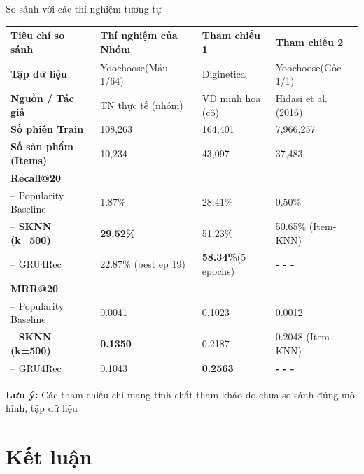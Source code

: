 \documentclass[aspectratio=169, 11pt]{beamer}
\begin{document}
\begin{frame}{So sánh với các thí nghiệm tương tự}
    \vspace{0.5cm}
    \centering
    \scriptsize %
    \begin{tabular}{lp{2.8cm}p{2.3cm}p{3.3cm}}
        \toprule
        \textbf{Tiêu chí so sánh} & \textbf{Thí nghiệm của Nhóm} & \textbf{Tham chiếu 1} & \textbf{Tham chiếu 2} \\
        \midrule
        \textbf{Tập dữ liệu} & Yoochoose(Mẫu 1/64) & Diginetica & Yoochoose(Gốc 1/1) \\
        \textbf{Nguồn / Tác giả} & TN thực tế (nhóm) & VD minh họa (cô) & Hidasi et al. (2016) \\
        \textbf{Số phiên Train} & 108,263 & 164,401 & 7,966,257 \\
        \textbf{Số sản phẩm (Items)} & 10,234 & 43,097 & 37,483 \\
        \midrule
        \textbf{Recall@20} & & & \\
        -- Popularity Baseline & 1.87\% & 28.41\% & 0.50\% \\
        -- \textbf{SKNN (k=500)} & \textbf{29.52\%} & 51.23\% & 50.65\% (Item-KNN) \\
        -- GRU4Rec & 22.87\% (best ep 19) & \textbf{58.34\%}(5 epochs) & \textbf{- - -} \\
        \midrule
        \textbf{MRR@20} & & & \\
        -- Popularity Baseline & 0.0041 & 0.1023 & 0.0012 \\
        -- \textbf{SKNN (k=500)} & \textbf{0.1350} & 0.2187 & 0.2048 (Item-KNN) \\
        -- GRU4Rec & 0.1043 & \textbf{0.2563} & \textbf{- - -} \\
        \bottomrule
    \end{tabular}

    \vspace{0.3cm}
    \flushleft
    \tiny %
    \textbf{Lưu ý:} 
    Các tham chiếu chỉ mang tính chất tham khảo do chưa so sánh đúng mô hình, tập dữ liệu
\end{frame}

\section{Kết luận}
\end{document}
